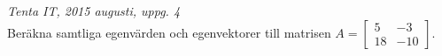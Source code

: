{\it Tenta IT, 2015 augusti, uppg. 4}\\
Beräkna samtliga egenvärden och egenvektorer till matrisen $A=\begin{bmatrix}5&-3\\18&-10\end{bmatrix}$.
